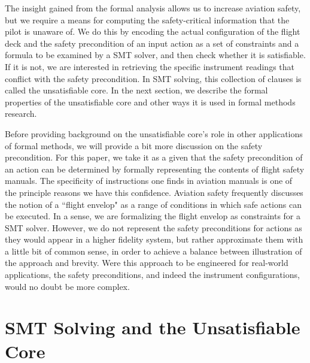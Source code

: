 The insight gained from the formal analysis allows us to increase aviation safety, but we require a means for computing the safety-critical information that the pilot is unaware of. We do this by encoding the actual configuration of the flight deck and the safety precondition of an input action as a set of constraints and a formula to be examined by a SMT solver, and then check whether it is satisfiable. If it is not, we are interested in retrieving the specific instrument readings that conflict with the safety precondition. In SMT solving, this collection of clauses is called the unsatisfiable core. In the next section, we describe the formal properties of the unsatisfiable core and other ways it is used in formal methods research.

Before providing background on the unsatisfiable core's role in other applications of formal methods, we will provide a bit more discussion on the safety precondition. For this paper, we take it as a given that the safety precondition of an action can be determined by formally representing the contents of flight safety manuals. The specificity of instructions one finds in aviation manuals is one of the principle reasons we have this confidence. Aviation safety frequently discusses the notion of a ``flight envelop" as a range of conditions in which safe actions can be executed. In a sense, we are formalizing the flight envelop as constraints for a SMT solver. However, we do not represent the safety preconditions for actions as they would appear in a higher fidelity system, but rather approximate them with a little bit of common sense, in order to achieve a balance between illustration of the approach and brevity. Were this approach to be engineered for real-world applications, the safety preconditions, and indeed the instrument configurations, would no doubt be more complex.

\section{SMT Solving and the Unsatisfiable Core}~\label{smt}

